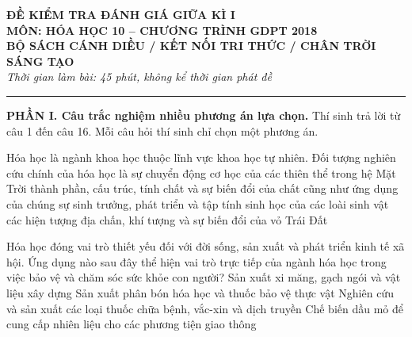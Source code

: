 \begin{center}
    \textbf{\LARGE ĐỀ KIỂM TRA ĐÁNH GIÁ GIỮA KÌ I}\\
    \textbf{\Large MÔN: HÓA HỌC 10 -- CHƯƠNG TRÌNH GDPT 2018}\\
    \textbf{\large BỘ SÁCH CÁNH DIỀU / KẾT NỐI TRI THỨC / CHÂN TRỜI SÁNG TẠO}\\
    \textit{Thời gian làm bài: 45 phút, không kể thời gian phát đề}
\end{center}
\hrule
\vspace{0.5cm}

\noindent\textbf{\large PHẦN I. Câu trắc nghiệm nhiều phương án lựa chọn.} Thí sinh trả lời từ câu 1 đến câu 16. Mỗi câu hỏi thí sinh chỉ chọn một phương án.

\begin{ex}
    Hóa học là ngành khoa học thuộc lĩnh vực khoa học tự nhiên. Đối tượng nghiên cứu chính của hóa học là
    \choice
    {sự chuyển động cơ học của các thiên thể trong hệ Mặt Trời}
    {\True thành phần, cấu trúc, tính chất và sự biến đổi của chất cũng như ứng dụng của chúng}
    {sự sinh trưởng, phát triển và tập tính sinh học của các loài sinh vật}
    {các hiện tượng địa chấn, khí tượng và sự biến đổi của vỏ Trái Đất}
\end{ex}

\begin{ex}
    Hóa học đóng vai trò thiết yếu đối với đời sống, sản xuất và phát triển kinh tế xã hội. Ứng dụng nào sau đây thể hiện vai trò trực tiếp của ngành hóa học trong việc bảo vệ và chăm sóc sức khỏe con người?
    \choice
    {Sản xuất xi măng, gạch ngói và vật liệu xây dựng}
    {Sản xuất phân bón hóa học và thuốc bảo vệ thực vật}
    {\True Nghiên cứu và sản xuất các loại thuốc chữa bệnh, vắc-xin và dịch truyền}
    {Chế biến dầu mỏ để cung cấp nhiên liệu cho các phương tiện giao thông}
\end{ex}

